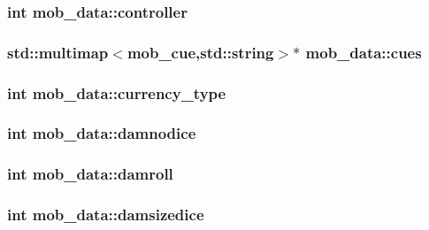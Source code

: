 \hypertarget{structmob__data_a510f2eca7e0b6bec48d9b775924d0725}{
\subsubsection[{controller}]{\setlength{\rightskip}{0pt plus 5cm}int mob\-\_\-data\-::controller}}\label{structmob__data_a510f2eca7e0b6bec48d9b775924d0725}
\hypertarget{structmob__data_a88707b282a1daaf4897b4732cbae9ecc}{
\subsubsection[{cues}]{\setlength{\rightskip}{0pt plus 5cm}std\-::multimap$<${\bf mob\-\_\-cue},std\-::string$>$$\ast$ mob\-\_\-data\-::cues}}\label{structmob__data_a88707b282a1daaf4897b4732cbae9ecc}
\hypertarget{structmob__data_a468fd7308031d96fe90dec94b2a90479}{
\subsubsection[{currency\-\_\-type}]{\setlength{\rightskip}{0pt plus 5cm}int mob\-\_\-data\-::currency\-\_\-type}}\label{structmob__data_a468fd7308031d96fe90dec94b2a90479}
\hypertarget{structmob__data_a75d005ecbdff926e58863be38aca1794}{
\subsubsection[{damnodice}]{\setlength{\rightskip}{0pt plus 5cm}int mob\-\_\-data\-::damnodice}}\label{structmob__data_a75d005ecbdff926e58863be38aca1794}
\hypertarget{structmob__data_aba7f229aab599659de17b09682920692}{
\subsubsection[{damroll}]{\setlength{\rightskip}{0pt plus 5cm}int mob\-\_\-data\-::damroll}}\label{structmob__data_aba7f229aab599659de17b09682920692}
\hypertarget{structmob__data_a225fdb99418302d385ec232a8e8e31d0}{
\subsubsection[{damsizedice}]{\setlength{\rightskip}{0pt plus 5cm}int mob\-\_\-data\-::damsizedice}}\label{structmob__data_a225fdb99418302d385ec232a8e8e31d0}
